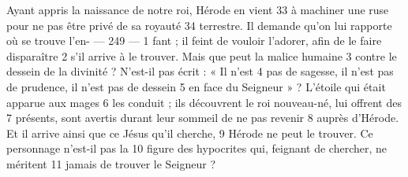 Ayant appris la naissance de notre roi, Hérode en vient	 
33	 	à machiner une ruse pour ne pas être privé de sa royauté	 
34	 	terrestre. Il demande qu'on lui rapporte où se trouve l'en-	 
 	--- 249 ---	 
1	 	fant ; il feint de vouloir l'adorer, afin de le faire disparaître	 
2	 	s'il arrive à le trouver. Mais que peut la malice humaine	 
3	 	contre le dessein de la divinité ? N'est-il pas écrit : « Il n'est	 
4	 	pas de sagesse, il n'est pas de prudence, il n'est pas de dessein	 
5	 	en face du Seigneur » ? L'étoile qui était apparue aux mages	 
6	 	les conduit ; ils découvrent le roi nouveau-né, lui offrent des	 
7	 	présents, sont avertis durant leur sommeil de ne pas revenir	 
8	 	auprès d'Hérode. Et il arrive ainsi que ce Jésus qu'il cherche,	 
9	 	Hérode ne peut le trouver. Ce personnage n'est-il pas la	 
10	 	figure des hypocrites qui, feignant de chercher, ne méritent	 
11	 	jamais de trouver le Seigneur ?